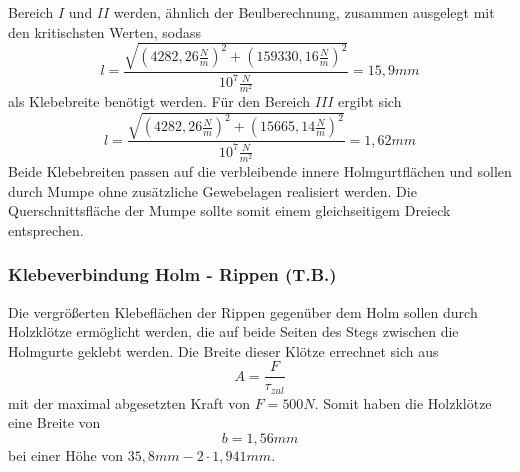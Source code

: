 \noindent Bereich $I$ und $II$ werden, ähnlich der Beulberechnung, zusammen ausgelegt mit den kritischsten Werten, sodass 
\begin{equation}
	l=\frac{\sqrt{(4282,26\frac{N}{m})^{2}+(159330,16\frac{N}{m})^{2}}}{10^{7}\frac{N}{m^{2}}}=15,9mm
\end{equation}
als Klebebreite benötigt werden. Für den Bereich $III$ ergibt sich
\begin{equation}
	l=\frac{\sqrt{(4282,26\frac{N}{m})^{2}+(15665,14\frac{N}{m})^{2}}}{10^{7}\frac{N}{m^{2}}}=1,62mm
\end{equation}
Beide Klebebreiten passen auf die verbleibende innere Holmgurtflächen und sollen durch Mumpe ohne zusätzliche Gewebelagen realisiert werden. Die Querschnittsfläche der Mumpe sollte somit einem gleichseitigem Dreieck entsprechen.

\subsubsection{Klebeverbindung Holm - Rippen (T.B.)}
Die vergrößerten Klebeflächen der Rippen gegenüber dem Holm sollen durch Holzklötze ermöglicht werden, die auf beide Seiten des Stegs zwischen die Holmgurte geklebt werden. Die Breite dieser Klötze errechnet sich aus 
\begin{equation}
	A=\frac{F}{\tau_{zul}}
\end{equation}
mit der maximal abgesetzten Kraft von $F=500N$.
Somit haben die Holzklötze eine Breite von 
\begin{equation}
	b=1,56mm
\end{equation}
bei einer Höhe von $35,8mm-2\cdot 1,941mm$.